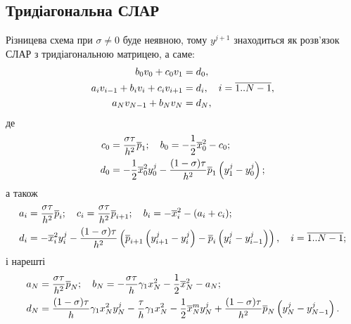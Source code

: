 \subsection{Тридіагональна СЛАР}

Різницева схема при $\sigma \ne 0$ буде неявною, тому $y^{j + 1}$ знаходиться як розв'язок СЛАР з тридіагональною матрицею, а саме:
\begin{equation}
    \begin{aligned}
        b_0 v_0 + c_0 v_1 &= d_0, \\
        a_i v_{i - 1} + b_i v_i + c_i v_{i + 1} &= d_i, \quad i = \overline{1..N - 1}, \\
        a_N v_{N - 1} + b_N v_N &= d_N, 
    \end{aligned}
\end{equation}
де
\begin{equation}
    \begin{aligned}
        c_0 &= \frac{\sigma \tau}{h^2} \overline{p}_1; \quad b_0 = -\frac{1}{2} \overline{x}_0^2 - c_0; \\
        d_0 &= -\frac{1}{2} \overline{x}_0^2 y_0^j - \frac{(1 - \sigma) \tau}{h^2} \overline{p}_1 \left( y_1^j - y_0^j \right);
    \end{aligned}
\end{equation}
а також
\begin{equation}
    \begin{aligned}
        a_i &= \frac{\sigma \tau}{h^2} \overline{p}_i; \quad c_i = \frac{\sigma \tau}{h^2} \overline{p}_{i + 1}; \quad b_i = -\overline{x}_i^2 - (a_i + c_i); \\
        d_i &= -\overline{x}_i^2 y_i^j - \frac{(1 - \sigma) \tau}{h^2} \left( \overline{p}_{i + 1} \left( y_{i + 1}^j - y_i^j \right) - \overline{p}_i \left( y_i^j - y_{i - 1}^j \right) \right), \quad i = \overline{1..N - 1};
    \end{aligned}
\end{equation}
і нарешті
\begin{equation}
    \begin{aligned}
        a_N &= \frac{\sigma \tau}{h^2} \overline{p}_N; \quad b_N = -\frac{\sigma \tau}{h} \gamma_1 x_N^2 - \frac{1}{2} \overline{x}_N^2 - a_N; \\
        d_N &= \frac{(1 - \sigma) \tau}{h} \gamma_1 x_N^2 y_N^j - \frac{\tau}{h} \gamma_1 x_N^2 - \frac{1}{2} \overline{x}_N^m y_N^j + \frac{(1 - \sigma) \tau}{h^2} \overline{p}_N \left( y_N^j - y_{N - 1}^j \right).
    \end{aligned}
\end{equation}

